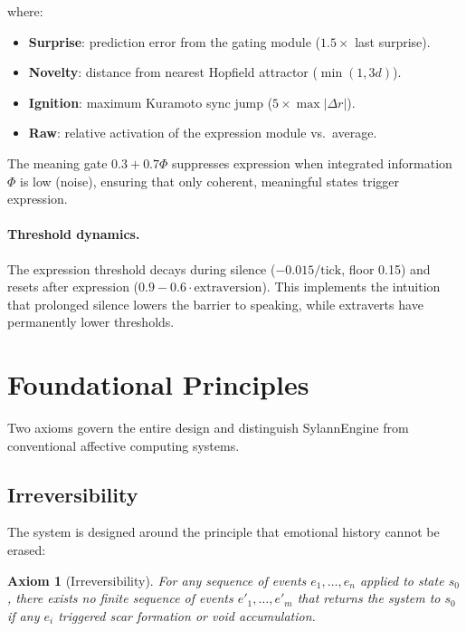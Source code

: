 \documentclass[11pt]{article}
\newtheorem{axiom}{Axiom}[section]
\begin{document}
where:
\begin{itemize}[leftmargin=*]
\item \textbf{Surprise}: prediction error from the gating module ($1.5 \times$ last surprise).
\item \textbf{Novelty}: distance from nearest Hopfield attractor ($\min(1, 3d)$).
\item \textbf{Ignition}: maximum Kuramoto sync jump ($5 \times \max|\Delta r|$).
\item \textbf{Raw}: relative activation of the expression module vs.\ average.
\end{itemize}

The meaning gate $0.3 + 0.7\Phi$ suppresses expression when integrated information $\Phi$ is low (noise), ensuring that only coherent, meaningful states trigger expression.

\paragraph{Threshold dynamics.} The expression threshold decays during silence ($-0.015/\text{tick}$, floor 0.15) and resets after expression ($0.9 - 0.6 \cdot \text{extraversion}$). This implements the intuition that prolonged silence lowers the barrier to speaking, while extraverts have permanently lower thresholds.

\section{Foundational Principles}
\label{sec:principles}

Two axioms govern the entire design and distinguish SylannEngine from conventional affective computing systems.

\subsection{Irreversibility}
\label{sec:irreversibility}

The system is designed around the principle that emotional history cannot be erased:

\begin{axiom}[Irreversibility]
For any sequence of events $e_1, \ldots, e_n$ applied to state $s_0$, there exists no finite sequence of events $e'_1, \ldots, e'_m$ that returns the system to $s_0$ if any $e_i$ triggered scar formation or void accumulation.
\end{axiom}
\end{document}
